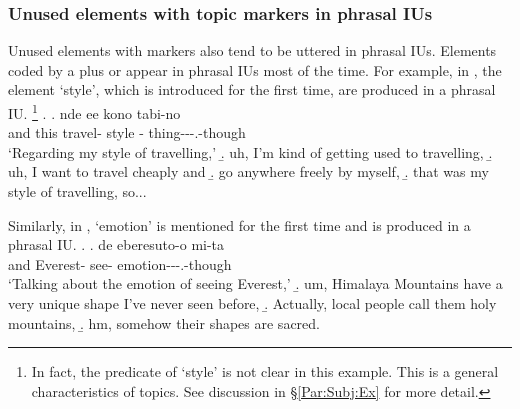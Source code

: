 \subsubsection{Unused elements with topic markers in phrasal IUs}\label{Int:Cor:InacTopic:PIU}

Unused elements with  markers also tend to be uttered in
phrasal IUs.
Elements coded by a  plus  or  appear
in phrasal IUs most of the time.
For example, in \Next[a],
the element  `style', which is introduced for the first time,
are produced in a phrasal IU.%
	\footnote{
	In fact, the predicate of `style' is not clear in this example.
	This is a general characteristics of topics.
	See discussion in \S \ref{Par:Subj:Ex} for more detail.
	}
%
\ex.
 \ag. nde {\iub} ee {\iub} kono {\iub} tabi-no {\iub}  {\iub}   {\iub} \\
      and {}  {} this {} travel- {} style {} - thing---.-though \\
      `Regarding my style of travelling,'
 \b. uh, I'm kind of getting used to travelling,
 \b. uh, I want to travel cheaply and
 \b. go anywhere freely by myself,
 \b. that was my style of travelling, so...

Similarly,
in \Next[a],
 `emotion' is mentioned for the first time and
is produced in a phrasal IU.
%
\ex.
 \ag. de eberesuto-o mi-ta  {\iub} \\
      and Everest- see- emotion---.-though {} \\
      `Talking about the emotion of seeing Everest,'
 \b. um, Himalaya Mountains have a very unique shape I've never seen before,
 \b. Actually, local people call them holy mountains,
 \b. hm, somehow their shapes are sacred.


